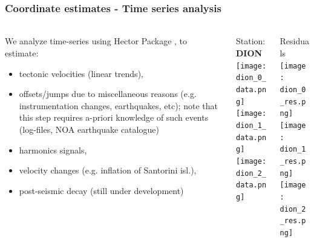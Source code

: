 \begin{frame}
  \frametitle{Coordinate estimates - Time series analysis}
  \framesubtitle{}
  \label{}
  \vskip-1cm
  \begin{columns}[T]
    \begin{column}{.4\textwidth}
      \footnotesize{
      We analyze time-series using Hector Package \citep{Bos2012}, to estimate:
      \begin{itemize}
        \item tectonic velocities (linear trends),
        \item offsets/jumps due to miscellaneous reasons (e.g. instrumentation 
          changes, earthquakes, etc); note that this step requires a-priori 
          knowledge of such events (log-files, NOA earthquake catalogue)
        \item harmonics signals,
        \item velocity changes (e.g. inflation of Santorini isl.),
        \item post-seismic decay (still under development)
      \end{itemize}}
    \end{column}
    \begin{column}{.3\textwidth}
      \begin{center}
      Station: \textbf{DION}\\
         \texttt{[image: dion\_0\_data.png]}\\
         \texttt{[image: dion\_1\_data.png]}\\
         \texttt{[image: dion\_2\_data.png]}
       \end{center} 
    \end{column}
    \begin{column}{.3\textwidth}
      \begin{center}
      Residuals\\
         \texttt{[image: dion\_0\_res.png]}\\
         \texttt{[image: dion\_1\_res.png]}\\
         \texttt{[image: dion\_2\_res.png]}
       \end{center} 
    \end{column}



  \end{columns}
 
\end{frame}
\note{}

